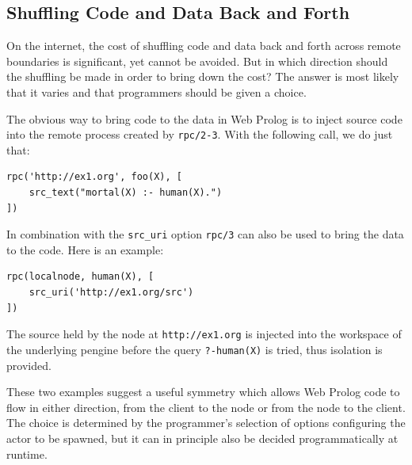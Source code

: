 \documentclass{tlp}
\begin{document}
\subsection{Shuffling Code and Data Back and Forth}

\noindent On the internet, the cost of shuffling code and data back and forth across remote boundaries is significant, yet cannot be avoided. But in which direction should the shuffling be made in order to bring down the cost? The answer is most likely that it varies and that programmers should be given a choice.


The obvious way to bring code to the data in Web Prolog is to inject source code into the remote process created by \texttt{rpc/2-3}. With the following call, we do just that:

\begin{lstlisting}
rpc('http://ex1.org', foo(X), [
    src_text("mortal(X) :- human(X).")
])
\end{lstlisting}

\noindent In combination with the \texttt{src\_uri} option \texttt{rpc/3} can also be used to bring the data to the code. Here is an example:


\begin{lstlisting}
rpc(localnode, human(X), [
    src_uri('http://ex1.org/src')
])
\end{lstlisting}

\noindent The source held by the node at \texttt{http://ex1.org} is injected into the workspace of the underlying pengine before the query \texttt{?-human(X)} is tried, thus isolation is provided.

These two examples suggest a useful symmetry which allows Web Prolog code to flow in either direction, from the client to the node or from the node to the client. The choice is determined by the programmer's selection of options configuring the actor to be spawned, but it can in principle also be decided programmatically at runtime.

\end{document}
